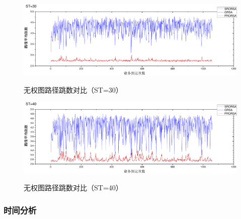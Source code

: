 \begin{figure}
\setlength{\belowcaptionskip}{-0.5cm}
\begin{center}
{\includegraphics[width=1 \textwidth]{figures/B30H.pdf}}
\end{center}
\caption{{\footnotesize{无权图路径跳数对比（ST=30）}}}
\label{B30H}
\end{figure}
\begin{figure}
\setlength{\belowcaptionskip}{-0.5cm}
\begin{center}
{\includegraphics[width=1 \textwidth]{figures/B40H.pdf}}
\end{center}
\caption{{\footnotesize{无权图路径跳数对比（ST=40）}}}
\label{B40H}
\end{figure}
\subsubsection{时间分析}

